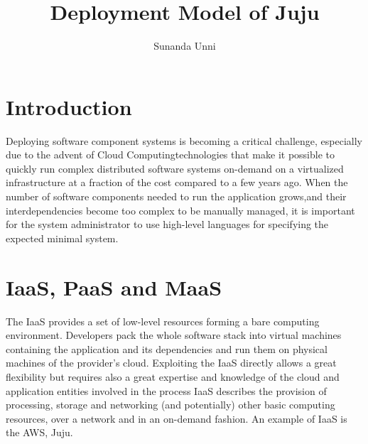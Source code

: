 \documentclass[9pt,twocolumn,twoside]{../../styles/osajnl}
\title{Deployment Model of Juju}
\author[1,*]{Sunanda Unni}
\affil[1]{School of Informatics and Computing, Bloomington, IN 47408, U.S.A.}
\affil[*]{Corresponding authors: suunni@indiana.edu}
\begin{document}
\maketitle




\section{Introduction}
Deploying software component systems \cite{lascu2015automatic} is
becoming a critical challenge, especially due to the advent of Cloud
Computing\SE technologies that make it possible to quickly run complex
distributed software systems on-demand on a virtualized infrastructure
at a fraction of the cost compared to a few years ago. When the number
of software components needed to run the application grows,\GE and their
interdependencies become too complex to be manually managed, it is
important for the system administrator to use high-level languages for
specifying the expected minimal system.



\section{IaaS, PaaS and MaaS}
The IaaS provides a set of low-level resources forming a bare
computing environment. Developers pack the whole software stack into
virtual machines containing the application and its dependencies and
run them on physical machines of the provider's cloud. Exploiting the
IaaS directly allows a great flexibility but requires also a great
expertise and knowledge of the cloud and application entities involved
in the process IaaS describes the provision of processing, storage and
networking (and potentially) other basic computing resources, over a
network and in an on-demand fashion. An example of IaaS is the
AWS\cite{www-aws}, Juju.
\end{document}

